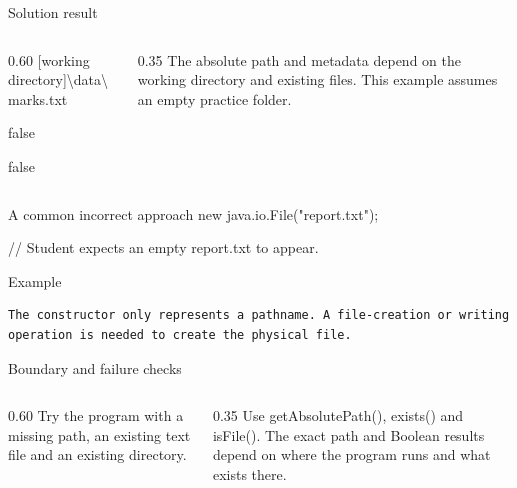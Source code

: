 \documentclass[10pt,aspectratio=169]{beamer}
\begin{document}
\begin{frame}[fragile,t]{Solution result}
\begin{columns}[T,onlytextwidth]\begin{column}{0.60\textwidth}
[working directory]\textbackslash{}data\textbackslash{}marks.txt\par false\par false
\end{column}\begin{column}{0.35\textwidth}\small
The absolute path and metadata depend on the working directory and existing files. This example assumes an empty practice folder.
\end{column}\end{columns}
\end{frame}

\begin{frame}[fragile,t]{A common incorrect approach}
new java.io.File("report.txt");\par // Student expects an empty report.txt to appear.
\vspace{1mm}\begin{block}{Example}
\begin{lstlisting}
The constructor only represents a pathname. A file-creation or writing operation is needed to create the physical file.
\end{lstlisting}
\end{block}
\end{frame}

\begin{frame}[fragile,t]{Boundary and failure checks}
\begin{columns}[T,onlytextwidth]\begin{column}{0.60\textwidth}
Try the program with a missing path, an existing text file and an existing directory.
\end{column}\begin{column}{0.35\textwidth}\small
Use getAbsolutePath(), exists() and isFile(). The exact path and Boolean results depend on where the program runs and what exists there.
\end{column}\end{columns}
\end{frame}
\end{document}
